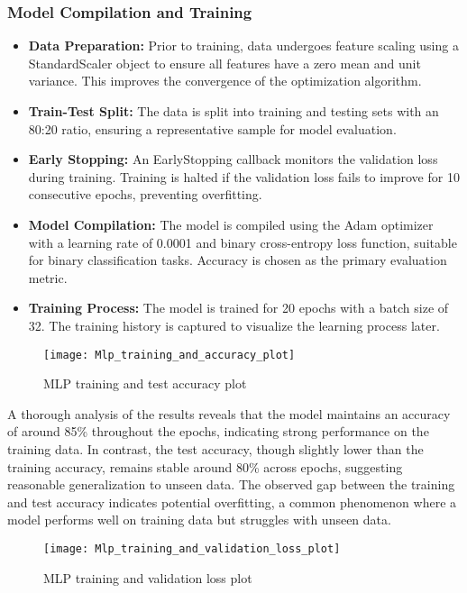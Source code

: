 \documentclass[
	article, %
	11pt, %
	draft, %
]{CSUniSchoolLabReport}
\begin{document}
\subsubsection{Model Compilation and Training}

\begin{itemize}
    \item \textbf{Data Preparation:} Prior to training, data undergoes feature scaling using a StandardScaler object to ensure all features have a zero mean and unit variance. This improves the convergence of the optimization algorithm.
    \item \textbf{Train-Test Split:} The data is split into training and testing sets with an 80:20 ratio, ensuring a representative sample for model evaluation.
    \item \textbf{Early Stopping:} An EarlyStopping callback monitors the validation loss during training. Training is halted if the validation loss fails to improve for 10 consecutive epochs, preventing overfitting.
    \item \textbf{Model Compilation:} The model is compiled using the Adam optimizer with a learning rate of 0.0001 and binary cross-entropy loss function, suitable for binary classification tasks. Accuracy is chosen as the primary evaluation metric.
    \item \textbf{Training Process:} The model is trained for 20 epochs with a batch size of 32. The training history is captured to visualize the learning process later.
\end{itemize}

\begin{figure}[H] 
	\centering
	\texttt{[image: Mlp\_training\_and\_accuracy\_plot]}
	\caption{MLP training and test accuracy plot}\label{fig:mlp_training_and_accuracy_plot}
\end{figure}

A thorough analysis of the results reveals that the model maintains an accuracy of around 85\% throughout the epochs, indicating strong performance on the training data. In contrast, the test accuracy, though slightly lower than the training accuracy, remains stable around 80\% across epochs, suggesting reasonable generalization to unseen data. The observed gap between the training and test accuracy indicates potential overfitting, a common phenomenon where a model performs well on training data but struggles with unseen data.

\begin{figure}[H] 
	\centering
	\texttt{[image: Mlp\_training\_and\_validation\_loss\_plot]}
	\caption{MLP training and validation loss plot}\label{fig:mlp_training_and_validation_loss_plot}
\end{figure}
\end{document}
